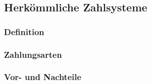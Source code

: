 
\subsection{Herkömmliche Zahlsysteme}
\subsubsection{Definition}

\subsubsection{Zahlungsarten}

\subsubsection{Vor- und Nachteile}